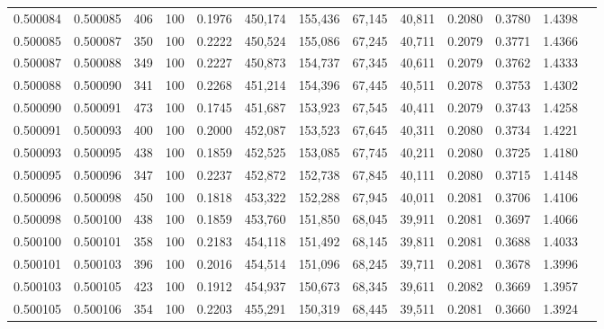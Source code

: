 \begin{tabular}{rrrrrrrrrrrrr}
0.500084 & 0.500085 &   406 & 100 &                                     0.1976 & 450,174 & 155,436 &  67,145 &  40,811 & 0.2080 & 0.3780 & 1.4398 \\
0.500085 & 0.500087 &   350 & 100 &                                     0.2222 & 450,524 & 155,086 &  67,245 &  40,711 & 0.2079 & 0.3771 & 1.4366 \\
0.500087 & 0.500088 &   349 & 100 &                                     0.2227 & 450,873 & 154,737 &  67,345 &  40,611 & 0.2079 & 0.3762 & 1.4333 \\
0.500088 & 0.500090 &   341 & 100 &                                     0.2268 & 451,214 & 154,396 &  67,445 &  40,511 & 0.2078 & 0.3753 & 1.4302 \\
0.500090 & 0.500091 &   473 & 100 &                                     0.1745 & 451,687 & 153,923 &  67,545 &  40,411 & 0.2079 & 0.3743 & 1.4258 \\
0.500091 & 0.500093 &   400 & 100 &                                     0.2000 & 452,087 & 153,523 &  67,645 &  40,311 & 0.2080 & 0.3734 & 1.4221 \\
0.500093 & 0.500095 &   438 & 100 &                                     0.1859 & 452,525 & 153,085 &  67,745 &  40,211 & 0.2080 & 0.3725 & 1.4180 \\
0.500095 & 0.500096 &   347 & 100 &                                     0.2237 & 452,872 & 152,738 &  67,845 &  40,111 & 0.2080 & 0.3715 & 1.4148 \\
0.500096 & 0.500098 &   450 & 100 &                                     0.1818 & 453,322 & 152,288 &  67,945 &  40,011 & 0.2081 & 0.3706 & 1.4106 \\
0.500098 & 0.500100 &   438 & 100 &                                     0.1859 & 453,760 & 151,850 &  68,045 &  39,911 & 0.2081 & 0.3697 & 1.4066 \\
0.500100 & 0.500101 &   358 & 100 &                                     0.2183 & 454,118 & 151,492 &  68,145 &  39,811 & 0.2081 & 0.3688 & 1.4033 \\
0.500101 & 0.500103 &   396 & 100 &                                     0.2016 & 454,514 & 151,096 &  68,245 &  39,711 & 0.2081 & 0.3678 & 1.3996 \\
0.500103 & 0.500105 &   423 & 100 &                                     0.1912 & 454,937 & 150,673 &  68,345 &  39,611 & 0.2082 & 0.3669 & 1.3957 \\
0.500105 & 0.500106 &   354 & 100 &                                     0.2203 & 455,291 & 150,319 &  68,445 &  39,511 & 0.2081 & 0.3660 & 1.3924 \\

\end{tabular}
